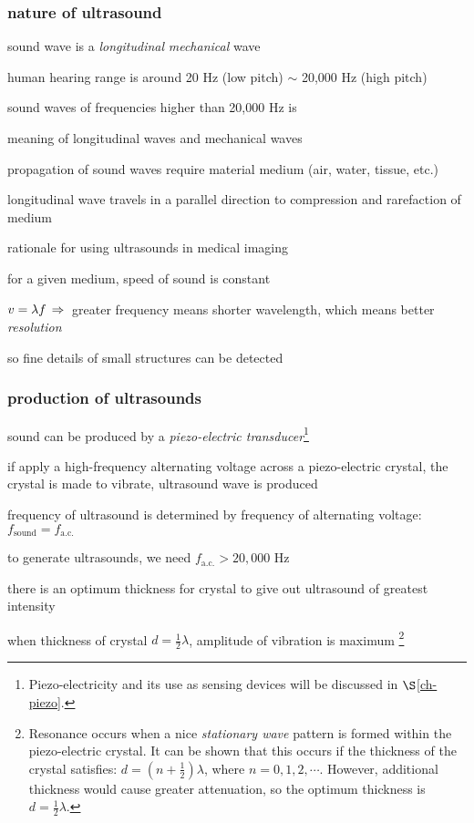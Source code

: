 \subsubsection{nature of ultrasound}

sound wave is a \emph{longitudinal} \emph{mechanical} wave

human hearing range is around 20 Hz (low pitch) $\sim$ 20,000 Hz (high pitch)

sound waves of frequencies higher than 20,000 Hz is 

\cmt meaning of longitudinal waves and mechanical waves
	
propagation of sound waves require material medium (air, water, tissue, etc.)
	
longitudinal wave travels in a parallel direction to compression and rarefaction of medium
	
\cmt rationale for using ultrasounds in medical imaging
	
for a given medium, speed of sound is constant

$v=\lambda f \, \Rightarrow \,$ greater frequency means shorter wavelength, which means better \emph{resolution}

so fine details of small structures can be detected


\subsubsection{production of ultrasounds}

sound can be produced by a \emph{piezo-electric transducer}\footnote{Piezo-electricity and its use as sensing devices will be discussed in $\S$\ref{ch-piezo}.}

if apply a high-frequency alternating voltage across a piezo-electric crystal, the crystal is made to vibrate, ultrasound wave is produced

\cmt frequency of ultrasound is determined by frequency of alternating voltage: $f_\text{sound} = f_\text{a.c.}$

to generate ultrasounds, we need $f_\text{a.c.} > 20,000 \text{ Hz}$

\cmt there is an optimum thickness for crystal to give out ultrasound of greatest intensity

when thickness of crystal $d=\frac{1}{2}\lambda$, amplitude of vibration is maximum
\footnote{Resonance occurs when a nice \emph{stationary wave} pattern is formed within the piezo-electric crystal. It can be shown that this occurs if the thickness of the crystal satisfies: $d=\left(n+\frac{1}{2}\right)\lambda$, where $n=0,1,2,\cdots$. However, additional thickness would cause greater attenuation, so the optimum thickness is $d=\frac{1}{2}\lambda$.}

